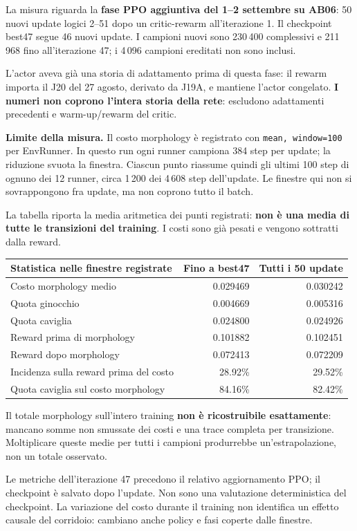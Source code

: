 La misura riguarda la \textbf{fase PPO aggiuntiva del 1--2 settembre su AB06}: 50 nuovi update logici 2--51 dopo un critic-rewarm all'iterazione 1. Il checkpoint best47 segue 46 nuovi update. I campioni nuovi sono 230\,400 complessivi e 211\,968 fino all'iterazione 47; i 4\,096 campioni ereditati non sono inclusi.

L'actor aveva già una storia di adattamento prima di questa fase: il rewarm importa il J20 del 27 agosto, derivato da J19A, e mantiene l'actor congelato. \textbf{I numeri non coprono l'intera storia della rete}: escludono adattamenti precedenti e warm-up/rewarm del critic.

\textbf{Limite della misura.} Il costo morphology è registrato con \texttt{mean, window=100} per EnvRunner. In questo run ogni runner campiona 384 step per update; la riduzione svuota la finestra. Ciascun punto riassume quindi gli ultimi 100 step di ognuno dei 12 runner, circa 1\,200 dei 4\,608 step dell'update. Le finestre qui non si sovrappongono fra update, ma non coprono tutto il batch.

La tabella riporta la media aritmetica dei punti registrati: \textbf{non è una media di tutte le transizioni del training}. I costi sono già pesati e vengono sottratti dalla reward.
\begin{center}\begin{tabular}{lrr}\toprule
Statistica nelle finestre registrate & Fino a best47 & Tutti i 50 update\\\midrule
Costo morphology medio & 0.029469 & 0.030242\\
Quota ginocchio & 0.004669 & 0.005316\\
Quota caviglia & 0.024800 & 0.024926\\
Reward prima di morphology & 0.101882 & 0.102451\\
Reward dopo morphology & 0.072413 & 0.072209\\
Incidenza sulla reward prima del costo & 28.92\% & 29.52\%\\
Quota caviglia sul costo morphology & 84.16\% & 82.42\%\\
\bottomrule\end{tabular}\end{center}
Il totale morphology sull'intero training \textbf{non è ricostruibile esattamente}: mancano somme non smussate dei costi e una trace completa per transizione. Moltiplicare queste medie per tutti i campioni produrrebbe un'estrapolazione, non un totale osservato.

Le metriche dell'iterazione 47 precedono il relativo aggiornamento PPO; il checkpoint è salvato dopo l'update. Non sono una valutazione deterministica del checkpoint. La variazione del costo durante il training non identifica un effetto causale del corridoio: cambiano anche policy e fasi coperte dalle finestre.
